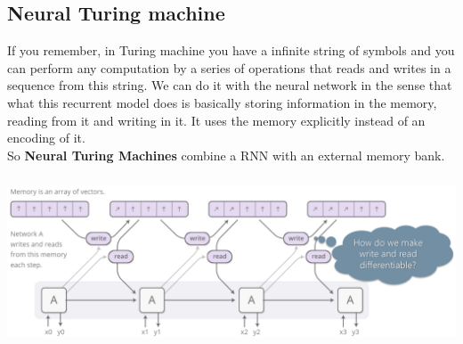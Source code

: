 \subsection{Neural Turing machine}
If you remember, in Turing machine you have a infinite
string of symbols
and you can perform any computation by a series of operations that reads and writes in a sequence from this string. We can do it with the neural network in
the sense that what this recurrent model does is basically storing information in the
memory, reading from it and writing in it. It uses the memory
explicitly 
instead of an encoding of it.\\
So \textbf{Neural Turing Machines} combine a RNN with an external memory bank. \\

\begin{minipage}{\linewidth}
        \centering
        \includegraphics[width=15cm, height=5cm]{images/ntm.png}
\end{minipage} \\ 

